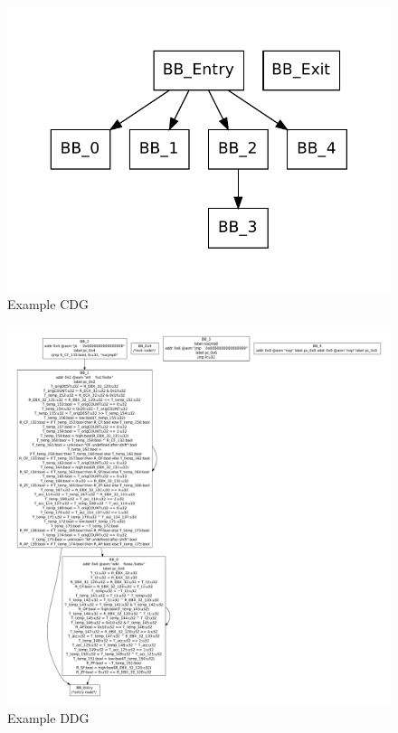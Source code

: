 \begin{figure}[p]
  \begin{center}
    \includegraphics{chap-examples/cdg.pdf}
  \end{center}
  \caption{Example CDG}
  \label{fig:cdg}
\end{figure}

\begin{figure}[p]
  \begin{center}
    \includegraphics[height=.9\textheight]{chap-examples/ddg.pdf}
  \end{center}
  \caption{Example DDG}
  \label{fig:ddg}
\end{figure}

